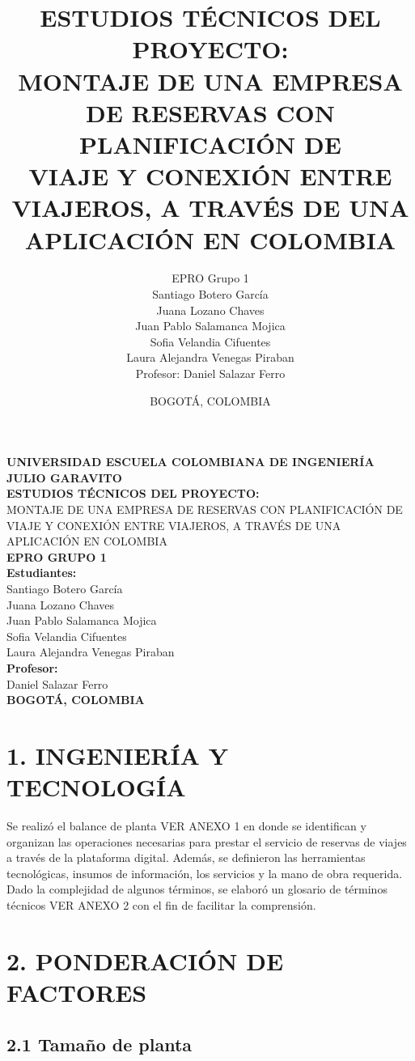 \documentclass[12pt,a4paper]{article}
\title{\textbf{ESTUDIOS TÉCNICOS DEL PROYECTO:}\\
MONTAJE DE UNA EMPRESA DE RESERVAS CON PLANIFICACIÓN DE\\
VIAJE Y CONEXIÓN ENTRE VIAJEROS, A TRAVÉS DE UNA\\
APLICACIÓN EN COLOMBIA}
\author{EPRO Grupo 1\\
    \small Santiago Botero García\\
    \small Juana Lozano Chaves\\
    \small Juan Pablo Salamanca Mojica\\
    \small Sofia Velandia Cifuentes\\
    \small Laura Alejandra Venegas Piraban\\
    \vspace{0.5cm}
    \small Profesor: Daniel Salazar Ferro}
\date{BOGOTÁ, COLOMBIA}
\newcommand{\sectiontitle}[1]{\section{#1}}
\newcommand{\subsectiontitle}[1]{\subsection{#1}}
\begin{document}
\begin{titlepage}
    \centering
    \vspace*{2cm}
    
    {\Large\textbf{UNIVERSIDAD ESCUELA COLOMBIANA DE INGENIERÍA JULIO GARAVITO}}\\[1cm]
    
    {\Large\textbf{ESTUDIOS TÉCNICOS DEL PROYECTO:}}\\[0.5cm]
    {\Large MONTAJE DE UNA EMPRESA DE RESERVAS CON PLANIFICACIÓN DE}\\[0.3cm]
    {\Large VIAJE Y CONEXIÓN ENTRE VIAJEROS, A TRAVÉS DE UNA}\\[0.3cm]
    {\Large APLICACIÓN EN COLOMBIA}\\[2cm]
    
    {\large\textbf{EPRO GRUPO 1}}\\[1.5cm]
    
    \textbf{Estudiantes:}\\[0.5cm]
    Santiago Botero García\\
    Juana Lozano Chaves\\
    Juan Pablo Salamanca Mojica\\
    Sofia Velandia Cifuentes\\
    Laura Alejandra Venegas Piraban\\[1.5cm]
    
    \textbf{Profesor:}\\[0.5cm]
    Daniel Salazar Ferro\\[2cm]
    
    \textbf{BOGOTÁ, COLOMBIA}
    
    \vfill
\end{titlepage}

\tableofcontents
\newpage

\sectiontitle{1. INGENIERÍA Y TECNOLOGÍA}

Se realizó el balance de planta VER ANEXO 1 en donde se identifican y organizan las operaciones necesarias para prestar el servicio de reservas de viajes a través de la plataforma digital. Además, se definieron las herramientas tecnológicas, insumos de información, los servicios y la mano de obra requerida. Dado la complejidad de algunos términos, se elaboró un glosario de términos técnicos VER ANEXO 2 con el fin de facilitar la comprensión.

\sectiontitle{2. PONDERACIÓN DE FACTORES}

\subsectiontitle{2.1 Tamaño de planta}
\end{document}
